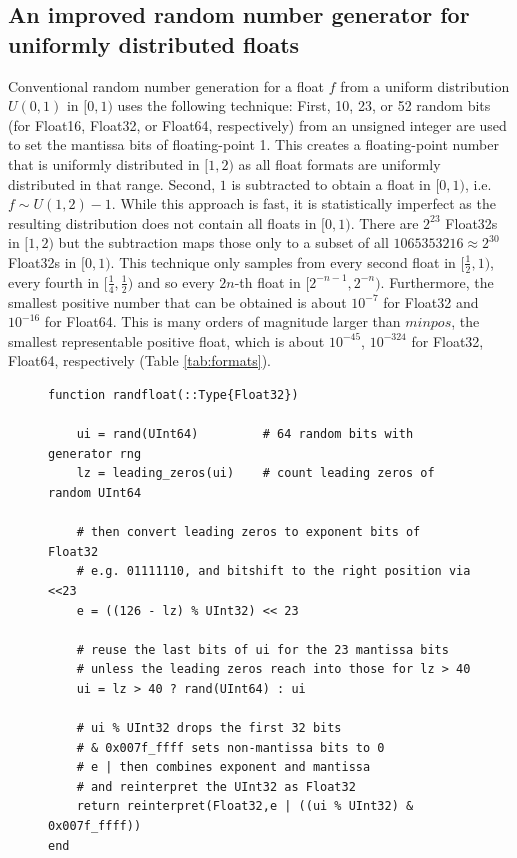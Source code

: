 \subsection{An improved random number generator for uniformly distributed floats}
\label{sec:randfloat}

Conventional random number generation for a float $f$ from a uniform distribution $U(0,1)$
in $[0,1)$ uses the following technique: First, 10, 23, or 52 random bits (for Float16, Float32, or Float64, respectively)
from an unsigned integer are used to set the mantissa bits of floating-point 1. This creates a floating-point
number that is uniformly distributed in $[1,2)$ as all float formats are uniformly distributed in that range. Second,
$1$ is subtracted to obtain a float in $[0,1)$, i.e. $f \sim U(1,2) - 1$. While this approach is fast, it is statistically
imperfect as the resulting distribution does not contain all floats in $[0,1)$. There are $2^{23}$ Float32s in $[1,2)$
but the subtraction maps those only to a subset of all $1065353216 \approx 2^{30}$ Float32s in $[0,1)$.
This technique only samples from every second float in $[\tfrac{1}{2},1)$, every fourth in
$[\tfrac{1}{4},\tfrac{1}{2})$ and so every $2n$-th float in $[2^{-n-1},2^{-n})$. Furthermore, the smallest positive
number that can be obtained is about $10^{-7}$ for Float32 and $10^{-16}$ for Float64. This is many orders of
magnitude larger than $minpos$, the smallest representable positive float, which is about $10^{-45}$, $10^{-324}$
for Float32, Float64, respectively (Table \ref{tab:formats}).

\begin{figure}[tbhp]
\begin{lstlisting}[language=JuliaLocal,label=lst:randfloat,caption={\textbf{An improved random number generator (RNG) for uniformly
distributed floats.} The Julia function \texttt{randfloat} takes \texttt{rng} as an argument for an RNG for 64-bit unsigned integers \texttt{UInt64}.
\texttt{\%} is the remainder after division, for unsigned integers effectively converting between unsigned integers by adding leading
zeros or discarding leading bits. \texttt{?} indicates a one-line if-clause. \texttt{\&} is the bitwise logical and-operation. \texttt{$\vert$}
is the bitwise logical or-operation.}]
function randfloat(::Type{Float32})

    ui = rand(UInt64)         # 64 random bits with generator rng
    lz = leading_zeros(ui)    # count leading zeros of random UInt64

    # then convert leading zeros to exponent bits of Float32
    # e.g. 01111110, and bitshift to the right position via <<23
    e = ((126 - lz) % UInt32) << 23

    # reuse the last bits of ui for the 23 mantissa bits
    # unless the leading zeros reach into those for lz > 40
    ui = lz > 40 ? rand(UInt64) : ui

    # ui % UInt32 drops the first 32 bits
    # & 0x007f_ffff sets non-mantissa bits to 0
    # e | then combines exponent and mantissa
    # and reinterpret the UInt32 as Float32
    return reinterpret(Float32,e | ((ui % UInt32) & 0x007f_ffff))
end
\end{lstlisting}
\end{figure}

